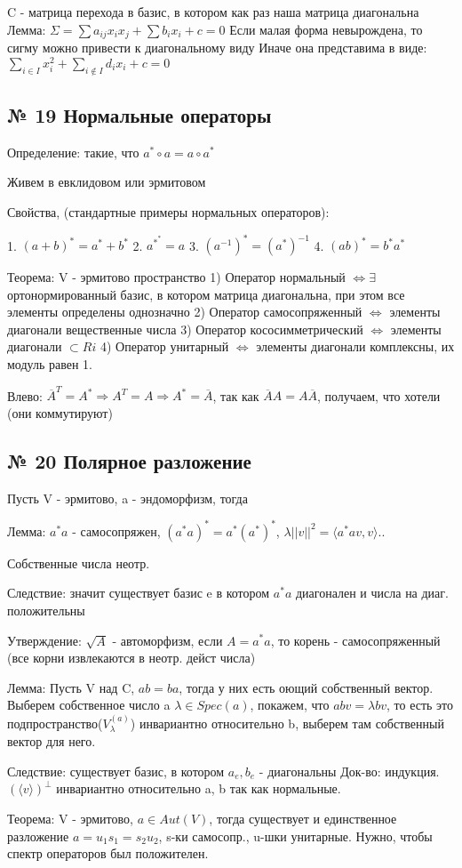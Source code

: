 \documentclass{article}
\begin{document}
C - матрица перехода в базис, в котором как раз наша матрица диагональна
Лемма: $\Sigma = \sum{a_{ij}x_ix_j} + \sum{b_ix_i} + c = 0$
Если малая форма невырождена, то сигму можно привести к диагональному виду
Иначе она представима в виде: $\sum\limits_{i \in I}{x_i^2} + \sum\limits_{i \notin I}{d_ix_i} + c = 0$

\subsection{\tiny № 19 Нормальные операторы}

Определение: такие, что $a^* \circ a = a \circ a^*$

Живем в евклидовом или эрмитовом

Свойства, (стандартные примеры нормальных операторов):

1. $(a + b)^* = a^* + b^*$
2. $a^{*^*} = a$
3. $(a^{-1})^* = (a^*)^{-1}$
4. $(ab)^* = b^*a^*$

Теорема:
V - эрмитово пространство
1) Оператор нормальный $\Leftrightarrow \exists $ ортонормированный базис, в котором матрица диагональна, при этом все элементы определены однозначно
2) Оператор самосопряженный $\Leftrightarrow$ элементы диагонали вещественные числа
3) Оператор кососимметрический $\Leftrightarrow$ элементы диагонали $\subset Ri$
4) Оператор унитарный $\Leftrightarrow$ элементы диагонали комплексны, их модуль равен 1.

Влево: $\overline{A}^T = A^* \Rightarrow A^T = A \Rightarrow A^* = \overline{A}$, так как $\overline{A}A = A\overline{A}$, получаем, что хотели (они коммутируют)

\subsection{\tiny № 20 Полярное разложение}

Пусть V - эрмитово, a - эндоморфизм, тогда

Лемма: $a^*a$ - самосопряжен, $(a^*a)^* =a^*(a^*)^*$, $\lambda ||v||^2 = \langle a^*a v, v \rangle$..

Собственные числа неотр.

Следствие: значит существует базис e в котором $a^*a$ диагонален и числа на диаг. положительны

Утверждение: $\sqrt{A}$ - автоморфизм, если $A = a^*a$, то корень - самосопряженный (все корни извлекаются в неотр. дейст числа)

Лемма: Пусть V над C, $ab = ba$, тогда у них есть оющий собственный вектор.
Выберем собственное число a $\lambda \in Spec(a)$, покажем, что $abv = \lambda bv$, то есть это подпространство($V_\lambda^{(a)}$) инвариантно относительно b, выберем там собственный вектор для него.

Следствие: существует базис, в котором $a_e, b_e$ - диагональны
Док-во: индукция. $(\langle v \rangle)^\perp$ инвариантно относительно a, b так как нормальные.

Теорема:
V - эрмитово, $a \in Aut(V)$, тогда существует и единственное разложение $a = u_1s_1 = s_2u_2$, s-ки самосопр., u-шки унитарные. Нужно, чтобы спектр операторов был положителен.
\end{document}
